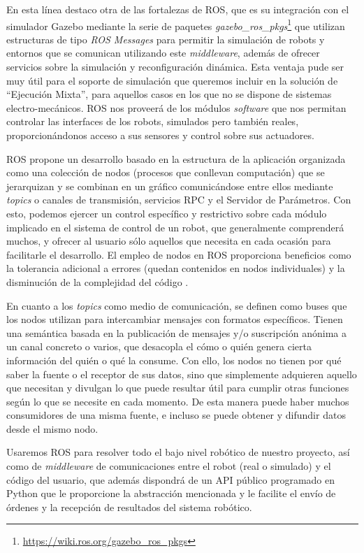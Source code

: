 En esta línea destaco otra de las fortalezas de ROS, que es su integración con el simulador Gazebo mediante la serie de paquetes \textit{gazebo\_ros\_pkgs}\footnote{\url{https://wiki.ros.org/gazebo\_ros\_pkgs}} que utilizan estructuras de tipo \textit{ROS Messages} para permitir la simulación de robots y entornos que se comunican utilizando este \textit{middleware}, además de ofrecer servicios sobre la simulación y reconfiguración dinámica. Esta ventaja pude ser muy útil para el soporte de simulación que queremos incluir en la solución de ``Ejecución Mixta'', para aquellos casos en los que no se dispone de sistemas electro-mecánicos. ROS nos proveerá de los módulos \textit{software} que nos permitan controlar las interfaces de los robots, simulados pero también reales, proporcionándonos acceso a sus sensores y control sobre sus actuadores.

ROS propone un desarrollo basado en la estructura de la aplicación organizada como una colección de nodos (procesos que conllevan computación) que se jerarquizan y se combinan en un gráfico comunicándose entre ellos mediante \textit{topics} o canales de transmisión, servicios RPC y el Servidor de
Parámetros. Con esto, podemos ejercer un control específico y restrictivo sobre cada módulo implicado en el sistema de control de un robot, que generalmente comprenderá muchos, y ofrecer al usuario sólo aquellos que necesita en cada ocasión para facilitarle el desarrollo. El empleo de nodos en ROS proporciona  beneficios como la tolerancia adicional a errores (quedan contenidos en nodos individuales) y la disminución de la complejidad del código .

En cuanto a los \textit{topics} como medio de comunicación, se definen como buses que los nodos utilizan para intercambiar mensajes con formatos específicos. Tienen una semántica  basada en la publicación de mensajes y/o suscripción anónima a un canal concreto o varios, que desacopla el cómo o quién genera cierta información del quién o qué la consume. Con ello, los nodos no tienen por qué saber la fuente o el receptor de sus datos, sino que simplemente adquieren aquello que necesitan y divulgan lo que puede resultar útil para cumplir otras funciones según lo que se necesite en cada momento. De esta manera puede haber muchos consumidores de una misma fuente, e incluso se puede obtener y difundir datos desde el mismo nodo.

Usaremos ROS para resolver todo el bajo nivel robótico de nuestro proyecto, así como de \textit{middleware} de comunicaciones entre el robot (real o simulado) y el código del usuario, que además dispondrá de un API público programado en Python que le proporcione la abstracción mencionada y le facilite el envío de órdenes y la recepción de resultados del sistema robótico.

